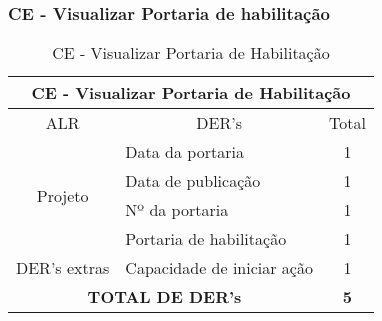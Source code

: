 \vfill
\pagebreak
  \subsubsection{CE - Visualizar Portaria de habilitação}
  \begin{table}[!h]
\centering
\caption{CE - Visualizar Portaria de Habilitação}
\label{ce_visualizar_portaria_de_habilitacao}
\begin{tabular}{|c|l|c|}
\hline
\multicolumn{3}{|c|}{CE - Visualizar Portaria de Habilitação}                    \\ \hline
ALR                      & \multicolumn{1}{c|}{DER's} & Total \\ \hline
\multirow{4}{*}{Projeto} & Data da portaria                         & 1     \\ \cline{2-3} 
                         & Data de publicação            & 1     \\ \cline{2-3} 
                         & Nº da portaria      & 1     \\ \cline{2-3} 
                         & Portaria de habilitação              & 1     \\ \hline
DER's extras & Capacidade de iniciar ação             & 1 \\ \hline
\multicolumn{2}{|c|}{\textbf{TOTAL DE DER's}}                  & \textbf{5}     \\ \hline
\end{tabular}
\end{table}



